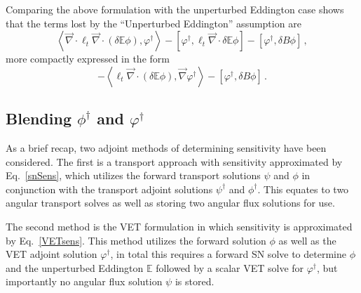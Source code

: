 \documentclass[12pt]{report}
\newcommand{\bra}{\left\langle}
\newcommand{\ket}{\right\rangle}
\newcommand{\sbra}{\left[}
\newcommand{\sket}{\right]}
\renewcommand{\div}{\vec{\nabla} \cdot}
\newcommand{\grad}{\vec{\nabla}}
\newcommand{\vefadj}{\varphi^\dag}
\newcommand{\Edd}{\mathbb{E}}
\newcommand{\BEdd}{B}
\newcommand{\isigt}{\ell_t}
\begin{document}
Comparing the above formulation with the unperturbed Eddington case shows that the terms lost by the ``Unperturbed Eddington'' assumption are 
\begin{equation}
\label{EddErrLong}
 \bra \div \isigt \div \left( \delta \Edd \phi \right), \vefadj \ket
- \sbra  \vefadj ,\isigt \div \delta \Edd \phi \sket
- \sbra \vefadj, \delta \BEdd \phi \sket \,,
\end{equation} 
more compactly expressed in the form
\begin{equation}
\label{EddErr}
 - \bra  \isigt \div \left( \delta \Edd \phi \right), \grad \vefadj \ket
- \sbra \vefadj, \delta \BEdd \phi \sket \,.
\end{equation} 

\subsection{Blending $\phi^\dag$ and $\varphi^\dag$}
As a brief recap, two adjoint methods of determining sensitivity have been considered. The first is a transport approach with sensitivity approximated by Eq.~\eqref{snSens}, which utilizes the forward transport solutions $\psi$ and $\phi$ in conjunction with the transport adjoint solutions $\psi^\dag$ and $\phi^\dag$. This equates to two angular transport solves as well as storing two angular flux solutions for use. 

The second method is the VET formulation in which sensitivity is approximated by Eq.~\eqref{VETsens}. This method utilizes the forward solution $\phi$ as well as the VET adjoint solution $\vefadj$, in total this requires a forward SN solve to determine $\phi$ and the unperturbed Eddington $\Edd$ followed by a scalar VET solve for $\vefadj$, but importantly no angular flux solution $\psi$ is stored.
\end{document}
